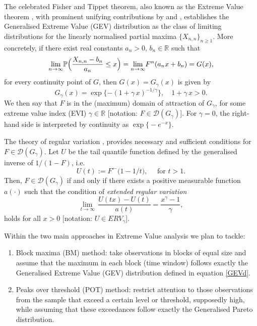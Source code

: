 \documentclass[a4paper]{article}
\newcommand{\field}[1]{\mathbb{#1}}
\newcommand{\real}{\ensuremath{{\field{R}}}}
\newcommand{\mc}[1]{{\ensuremath{\mathcal{#1}}}}
\newcommand{\limit}[1]{\ensuremath{\displaystyle {\lim_{#1 \rightarrow{\infty}}}}}
\begin{document}
The celebrated Fisher and Tippet theorem, also known as the Extreme Value theorem \citep{ft28}, with prominent unifying contributions by \cite{Gnedenko:43} and \cite{deHaan:70}, establishes the Generalised Extreme Value (GEV) distribution as the class of limiting distributions for the linearly normalised partial maxima $\{X_{n,n} \}_{n\geq 1}$. More concretely, if there exist real constants $a_n>0$, $b_n \in \real$ such that
\begin{equation}\label{EVTheo}
	\limit{n} \mathbb{P} \Bigl( \frac{X_{n,n}-b_n}{a_n} \leq x\Bigr)= \limit{n} F^n (a_n x + b_n) = G(x),
\end{equation}
for every continuity point of $G$, then $G(x)= G_{\gamma}(x)$ is given by
\begin{equation}\label{GEVd}
	G_{\gamma}(x)= \exp \{ -(1+ \gamma\, x)^{-1/\gamma}\}, \quad 1+\gamma\,x >0.
\end{equation}
We then say that $F$ is in the (maximum) domain of attraction of $G_\gamma$,  for some extreme value index (EVI) $\gamma \in \real$ [notation: $F \in \mathcal{D}(G_{\gamma}) $]. For $\gamma=0$, the right-hand side is interpreted by continuity as $\exp\bigl\{-e^{-x}\bigr\}$. 

The theory of regular variation \citep{Binghametal:87,deHaan:70, deHF:06}, provides necessary and sufficient conditions for $F\in \mc{D}(G_{\gamma})$. Let $U$ be the tail quantile function defined by the generalised inverse of $1/(1-F)$, i.e.
\begin{equation*}
U(t):=   F^{\leftarrow} \bigl( 1-1/t\bigr), \quad \mbox{ for } t>1.
\end{equation*}
Then, $F\in \mc{D}(G_{\gamma})$ if and only if there exists a positive  measurable function $a(\cdot)$ such that the condition of \emph{extended regular variation}
\begin{equation}\label{ERVU}
	\limit{t}\,\frac{U(tx)-U(t)}{a(t)}= \frac{x^{\gamma}-1}{\gamma},
\end{equation}
holds for all $x>0$ [notation: $U\in ERV_{\gamma}$].

Within the two main approaches in Extreme Value analysis we plan to tackle:
\begin{enumerate}
\item\label{BM} Block maxima (BM) method: take observations in blocks of equal size and assume that the maximum in each block (time window) follows exactly the Generalised Extreme Value (GEV) distribution defined in equation \ref{GEVd}.
\item\label{POT} Peaks over threshold (POT) method: restrict attention to those observations from the sample that exceed a certain level or threshold, supposedly high, while assuming that these exceedances follow exactly the Generalised Pareto distribution.	
\end{enumerate}
\end{document}
